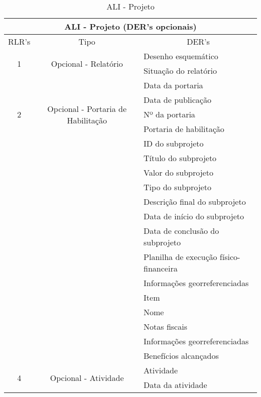 	  \begin{table}[!h]
	  \centering
	  \caption{ALI - Projeto}
	  \label{ali_projeto}
	  \begin{tabular}{|c|c|l|}
	  \hline
	  \multicolumn{3}{|c|}{\textbf{ALI - Projeto (DER's opcionais)}}                                                      \\ \hline
	  \multicolumn{1}{|l|}{RLR's} & Tipo                         & \multicolumn{1}{c|}{DER's}  \\ \hline
	  \multirow{2}{*}{1}         &\multirow{2}{*}{Opcional - Relatório}    & Desenho esquemático\\ \cline{3-3}
				      &				& Situação do relatório \\ \hline
	  \multirow{5}{*}{2}         &\multirow{5}{*}{Opcional - Portaria de Habilitação}    & Data da portaria   \\ \cline{3-3}   
				      &						& Data de publicação   \\ \cline{3-3} 
				      &						& Nº da portaria      \\ \cline{3-3} 
				      &						& Portaria de habilitação        \\ \hline
	  \multirow{14}{*}{3}         &\multirow{14}{*}{Opcional- Subprojeto}    & ID do subprojeto               \\ \cline{3-3} 
				      &                              & Título do subprojeto             \\ \cline{3-3} 
				      &                              & Valor do subprojeto      \\ \cline{3-3} 
				      &                              & Tipo do subprojeto          \\ \cline{3-3} 
				      &                              & Descrição final do subprojeto          \\ \cline{3-3} 
				      &                              & Data de início do subprojeto                  \\ \cline{3-3} 
				      &                              & Data de conclusão do subprojeto                 \\ \cline{3-3}
				      &				 & Planilha de execução físico-financeira \\ \cline{3-3} 
				      &  				 & Informações georreferenciadas \\ \cline{3-3}         
				      &				 & Item \\ \cline{3-3} 
				      &  				 & Nome \\ \cline{3-3}
				      &				 & Notas fiscais \\ \cline{3-3} 
				      &  				 & Informações georreferenciadas \\ \cline{3-3}         
				      &                              & Benefícios alcançados    \\ \hline
		\multirow{2}{*}{4}         &\multirow{2}{*}{Opcional - Atividade}    & Atividade \\ \cline{3-3}
				      &				& Data da atividade \\ \hline
	  \end{tabular}
	  \end{table}
      
